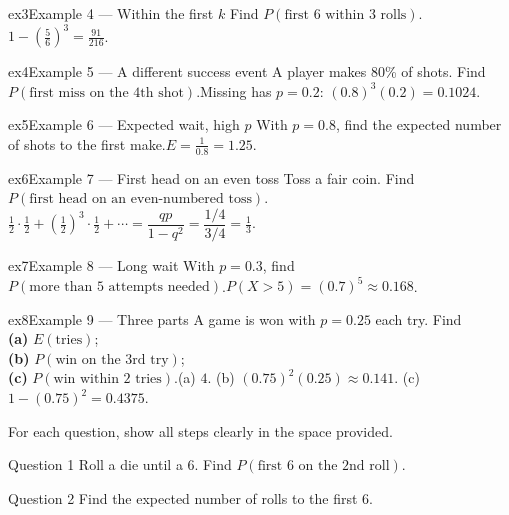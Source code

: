 \documentclass[11pt]{article}
\begin{document}
\begin{example}{ex3}{Example 4 --- Within the first $k$}
Find $P(\text{first 6 within 3 rolls})$.\soln $1-\left(\tfrac56\right)^3=\tfrac{91}{216}$.
\end{example}

\begin{example}{ex4}{Example 5 --- A different success event}
A player makes 80\% of shots. Find $P(\text{first miss on the 4th shot})$.\soln Missing has $p=0.2$: $(0.8)^3(0.2)=0.1024$.
\end{example}

\begin{example}{ex5}{Example 6 --- Expected wait, high $p$}
With $p=0.8$, find the expected number of shots to the first make.\soln $E=\tfrac{1}{0.8}=1.25$.
\end{example}

\begin{example}{ex6}{Example 7 --- First head on an even toss}
Toss a fair coin. Find $P(\text{first head on an even-numbered toss})$.\soln $\tfrac12\cdot\tfrac12+\left(\tfrac12\right)^3\cdot\tfrac12+\cdots=\dfrac{qp}{1-q^2}=\dfrac{1/4}{3/4}=\tfrac13$.
\end{example}

\begin{example}{ex7}{Example 8 --- Long wait}
With $p=0.3$, find $P(\text{more than 5 attempts needed})$.\soln $P(X>5)=(0.7)^5\approx0.168$.
\end{example}

\begin{example}{ex8}{Example 9 --- Three parts}
A game is won with $p=0.25$ each try. Find \\ \textbf{(a)} $E(\text{tries})$; \\ \textbf{(b)} $P(\text{win on the 3rd try})$; \\ \textbf{(c)} $P(\text{win within 2 tries})$.\soln (a) $4$. (b) $(0.75)^2(0.25)\approx0.141$. (c) $1-(0.75)^2=0.4375$.
\end{example}

\clearpage
{}
For each question, show all steps clearly in the space provided.

\begin{qbox}{Question 1}
Roll a die until a 6. Find $P(\text{first 6 on the 2nd roll})$.\workspace{2.4cm}
\end{qbox}

\begin{qbox}{Question 2}
Find the expected number of rolls to the first 6.\workspace{2.4cm}
\end{qbox}
\end{document}
